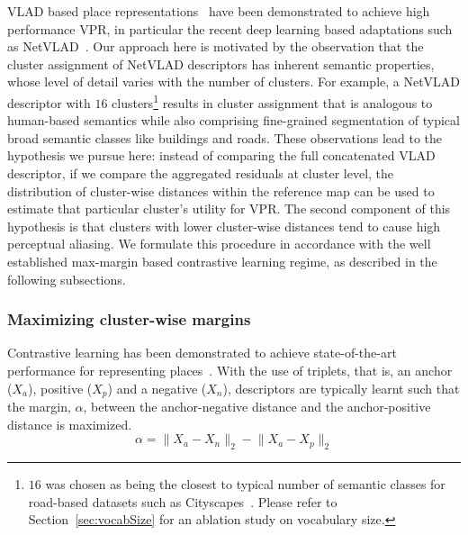 \documentclass[letterpaper, 10 pt, conference]{ieeeconf}  \fi
\begin{document}
VLAD based place representations~\cite{jegou2010aggregating,torii201524,arandjelovic2016netvlad,garg2018lost} have been demonstrated to achieve high performance VPR, in particular the recent deep learning based adaptations such as NetVLAD~\cite{arandjelovic2016netvlad}. Our approach here is motivated by the observation that the cluster assignment of NetVLAD descriptors has inherent semantic properties, whose level of detail varies with the number of clusters. For example, a NetVLAD descriptor with $16$ clusters\footnote{$16$ was chosen as being the closest to typical number of semantic classes for road-based datasets such as Cityscapes~\cite{cordts2016cityscapes}. Please refer to Section~\ref{sec:vocabSize} for an ablation study on vocabulary size.} results in cluster assignment that is analogous to human-based semantics while also comprising fine-grained segmentation of typical broad semantic classes like buildings and roads. These observations lead to the hypothesis we pursue here: instead of comparing the full concatenated VLAD descriptor, if we compare the aggregated residuals at cluster level, the distribution of cluster-wise distances within the reference map can be used to estimate that particular cluster's utility for VPR. The second component of this hypothesis is that clusters with lower cluster-wise distances tend to cause high perceptual aliasing. We formulate this procedure in accordance with the well established max-margin based contrastive learning regime, as described in the following subsections.

\subsubsection{Maximizing cluster-wise margins}
Contrastive learning has been demonstrated to achieve state-of-the-art performance for representing places~\cite{arandjelovic2016netvlad,revaud2019learning,radenovic2018fine}. With the use of triplets, that is, an anchor ($X_a$), positive ($X_p$) and a negative ($X_n$), descriptors are typically learnt such that the margin, $\alpha$, between the anchor-negative distance and the anchor-positive distance is maximized. 
\begin{equation}
    \alpha = \lVert X_a-X_n\rVert_2 - \lVert X_a-X_p\rVert_2
\end{equation}
\end{document}

